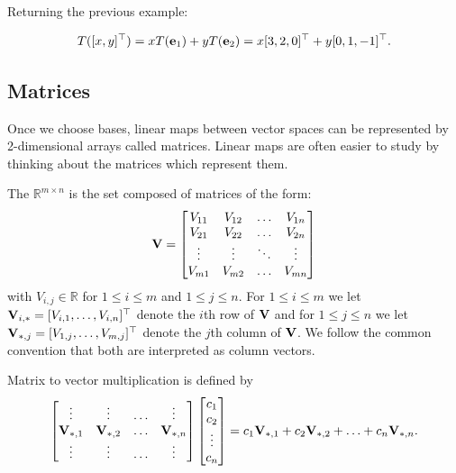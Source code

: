\begin{example}
Returning the previous example: 

$$T([x,y]^\top) = x T(\ve_1) + y T(\ve_2) = x [3,2,0]^\top
+ y [0,1,-1]^\top. $$
\end{example}

\subsection{Matrices}

Once we choose bases, linear maps between vector spaces can be represented by 2-dimensional arrays called matrices. Linear maps are often easier to study by thinking about the matrices which represent them. 

\begin{definition}
The  $\mathbb R^{m \times n}$ is the set composed of matrices of the form: 
$$
\MV =
\begin{bmatrix}
V_{11} & V_{12} & \ldots & V_{1n} \\
V_{21} & V_{22} & \ldots & V_{2n} \\
\vdots & \vdots & \ddots & \vdots \\
V_{m1} & V_{m2} & \ldots & V_{mn} \\
\end{bmatrix} $$
with $V_{i,j} \in \mathbb R$ for $1\leq i\leq m$ and $1\leq j\leq n$. For $1\leq i\leq m$ we let $\MV_{i,*} = [V_{i,1},\dots,V_{i,n}]^\top$ denote the $i$th row of $\MV$ and for $1\leq j\leq n$ we let $\MV_{*,j} = [V_{1,j},\dots,V_{m,j}]^\top$ denote the $j$th column of $\MV$. We follow the common convention that both are interpreted as column vectors.
\end{definition}

\begin{definition}
Matrix to vector multiplication is defined by 
$$\begin{bmatrix}
\vdots & \vdots & \ldots & \vdots \\
\MV_{*,1} & \MV_{*,2} & \ldots & \MV_{*,n} \\
\vdots & \vdots & \ldots & \vdots \\
\end{bmatrix} \begin{bmatrix}
c_1 \\
c_2 \\
\vdots \\
c_n
\end{bmatrix} = c_1 \MV_{*,1} + c_2 \MV_{*,2} + \ldots + c_n \MV_{*,n}.$$
\end{definition}

